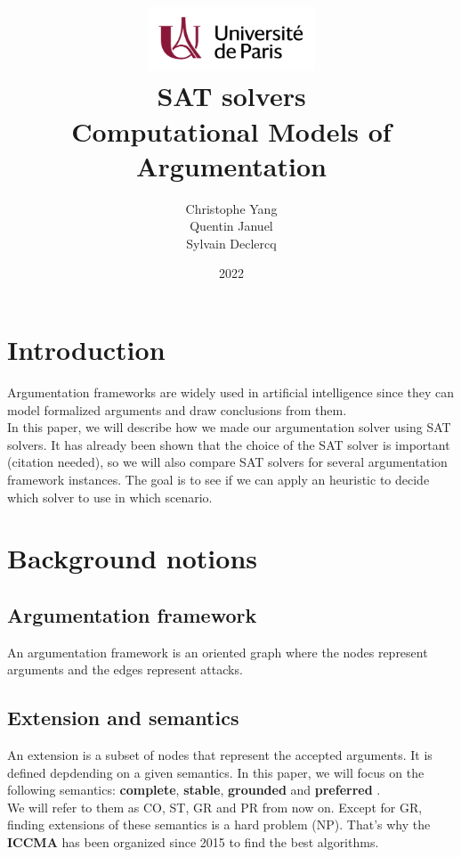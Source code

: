 \documentclass[11pt]{article}
\title{
	\centering
	\includegraphics[width=5cm]{univ-logo} \\
	\vspace{5cm}
	\textbf{SAT solvers} \\
	Computational Models of Argumentation
	\vspace{5cm}
}
\author{
    Christophe Yang \\
    Quentin Januel \\
    Sylvain Declercq
}
\date{2022}
\begin{document}
\maketitle

\newpage

\tableofcontents

\newpage

\section{Introduction}
Argumentation frameworks are widely used in artificial intelligence since they can model formalized arguments and draw conclusions from them. \\
In this paper, we will describe how we made our argumentation solver using SAT solvers.
It has already been shown that the choice of the SAT solver is important (citation needed), so we will also compare SAT solvers for several argumentation framework instances. The goal is to see if we can apply an heuristic to decide which solver to use in which scenario.

\section{Background notions}

\subsection{Argumentation framework}
An argumentation framework is an oriented graph where the nodes represent arguments and the edges represent attacks.

\subsection{Extension and semantics}
An extension is a subset of nodes that represent the accepted arguments. It is defined depdending on a given semantics. In this paper, we will focus on the following semantics: \textbf{complete}, \textbf{stable}, \textbf{grounded} and \textbf{preferred} \cite{dung1995acceptability}. \\
We will refer to them as CO, ST, GR and PR from now on.
Except for GR, finding extensions of these semantics is a hard problem (NP). That's why the \textbf{ICCMA}\cite{iccma} has been organized since 2015 to find the best algorithms. \\ \\
\end{document}
